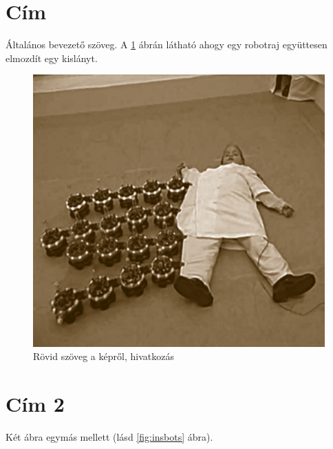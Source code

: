 \section{Cím}

Általános bevezető szöveg. A \ref{fig:child_dragged} ábrán látható ahogy egy robotraj együttesen elmozdít egy kislányt.

\begin{figure}[h]
    \centering
    \includegraphics[scale=0.6]{figures/images/literature/child_dragged_robots.png}
    \caption{Rövid szöveg a képről, hivatkozás \cite{parker2016multiple}}
    \label{fig:child_dragged}
\end{figure}

\section{Cím 2}

Két ábra egymás mellett (lásd \ref{fig:insbots} ábra).

